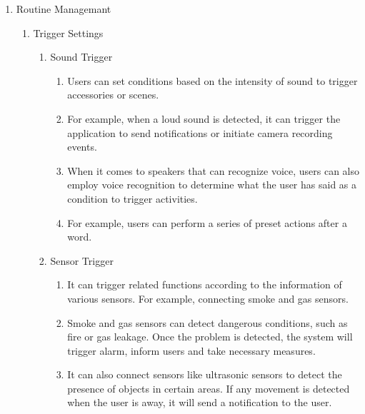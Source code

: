 \begin{enumerate}[label=\arabic*.]
    \item {\large{Routine Managemant}}\\
          \begin{enumerate}[label*={\arabic*.}]
              \item {\large{Trigger Settings}}\\
                    \begin{enumerate}[label*={\alph*.},ref=\theenumi.\arabic*]
                        \setlength{\itemindent}{0.5cm}

                        \item {\large{Sound Trigger}}\\
                              \begin{enumerate}[label*={\arabic*.},ref=\theenumi.\arabic*]
                                  \setlength{\itemindent}{0.5cm}
                                  \item Users can set conditions based on the intensity of sound to trigger accessories or scenes.\\
                                  \item For example, when a loud sound is detected, it can trigger the application to send notifications or initiate camera recording events.\\
                                  \item When it comes to speakers that can recognize voice, users can also employ voice recognition to determine what the user has said as a condition to trigger activities. \\
                                  \item For example, users can perform a series of preset actions after a word.\\
                              \end{enumerate}

                        \item {\large{Sensor Trigger}}\\
                              \begin{enumerate}[label*={\arabic*.},ref=\theenumi.\arabic*]
                                  \setlength{\itemindent}{0.5cm}
                                  \item It can trigger related functions according to the information of various sensors. For example, connecting smoke and gas sensors.\\
                                  \item Smoke and gas sensors can detect dangerous conditions, such as fire or gas leakage. Once the problem is detected, the system will trigger alarm, inform users and take necessary measures.\\
                                  \item It can also connect sensors like ultrasonic sensors to detect the presence of objects in certain areas. If any movement is detected when the user is away, it will send a notification to the user.\\
                              \end{enumerate}


\end{enumerate}
\end{enumerate}
\end{enumerate}
